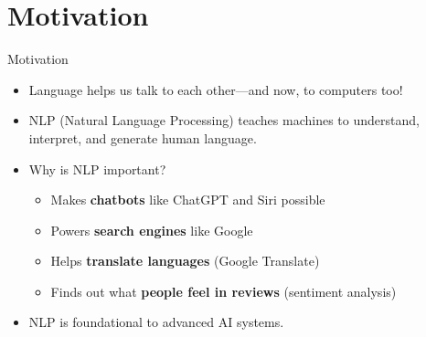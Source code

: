 \section{Motivation}
\begin{frame}{Motivation}
    \begin{itemize}
        \setlength{\itemsep}{0.75em}
        \item Language helps us talk to each other—and now, to computers too!
        \item NLP (Natural Language Processing) teaches machines to understand, interpret, and generate human language.
        \item Why is NLP important?
        \begin{itemize}
            \item Makes \textbf{chatbots} like ChatGPT and Siri possible
            \item Powers \textbf{search engines} like Google
            \item Helps \textbf{translate languages} (Google Translate)
            \item Finds out what \textbf{people feel in reviews} (sentiment analysis)
        \end{itemize}
        \item NLP is foundational to advanced AI systems.
    \end{itemize}

\end{frame}
